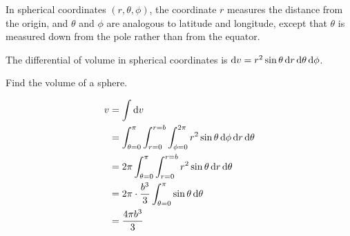 In spherical coordinates
$(r,\theta,\phi)$, the coordinate
$r$ measures the distance from the origin, and $\theta$ and $\phi$ are analogous to
latitude and longitude, except that $\theta$ is measured down from the pole rather than
from the equator.


The differential of volume in spherical coordinates is $\operatorname{d\!} v = r^2\sin\theta \operatorname{d\!} r\operatorname{d\!}\theta\operatorname{d\!}\phi$.

\begin{eg}
\egquestion Find the volume of a sphere.

\eganswer
\begin{align*}
  v &= \int \operatorname{d\!} v \\
    &= \int_{\theta=0}^\pi \int_{r=0}^{r=b} \int_{\phi=0}^{2\pi} r^2\sin\theta \operatorname{d\!}\phi \operatorname{d\!} r\operatorname{d\!}\theta \\
    &= 2\pi \int_{\theta=0}^\pi \int_{r=0}^{r=b}  r^2\sin\theta \operatorname{d\!} r\operatorname{d\!}\theta \\
    &= 2\pi\cdot\frac{b^3}{3} \int_{\theta=0}^\pi \sin\theta \operatorname{d\!}\theta \\
    &= \frac{4\pi b^3}{3}
\end{align*}
\end{eg}

